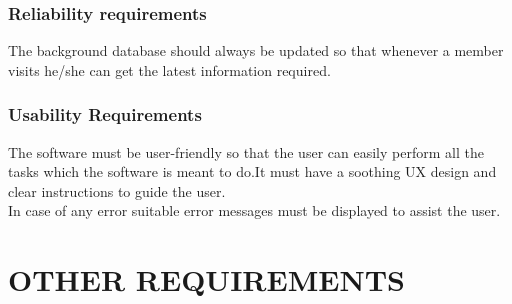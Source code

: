 \documentclass{article}
\begin{document}
\subsubsection{Reliability requirements}
The background database should always be updated so that whenever a member visits he/she can get the latest information required.
\subsubsection{Usability Requirements}
The software must be user-friendly so that the user can easily perform all the tasks which the software is meant to do.It must have a soothing UX design and clear instructions to guide the user.
\\In case of any error suitable error messages must be displayed to assist the user.


\section{OTHER REQUIREMENTS}
\end{document}
